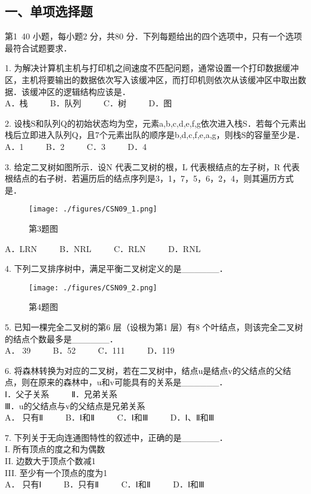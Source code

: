 
\subsection{一、单项选择题}
第1~40 小题，每小题2 分，共80 分．下列每题给出的四个选项中，只有一个选项最符合试题要求．

1. 为解决计算机主机与打印机之间速度不匹配问题，通常设置一个打印数据缓冲区，主机将要输出的数据依次写入该缓冲区，而打印机则依次从该缓冲区中取出数据．该缓冲区的逻辑结构应该是． \\
A．栈 $\qquad$ B．队列 $\qquad$ C．树 $\qquad$ D．图

2. 设栈S和队列Q的初始状态均为空，元素a,b,c,d,e,f,g依次进入栈S．若每个元素出栈后立即进入队列Q，且7个元素出队的顺序是b,d,c,f,e,a,g，则栈S的容量至少是． \\
A．1 $\qquad$ B．2 $\qquad$ C．3 $\qquad$ D．4

3. 给定二叉树如图所示．设N 代表二叉树的根，L 代表根结点的左子树，R 代表根结点的右子树．若遍历后的结点序列是3，1，7，5，6，2，4，则其遍历方式是． \\
\begin{figure}[ht]
\centering
\texttt{[image: ./figures/CSN09\_1.png]}
\caption{第3题图} \label{CSN09_fig1}
\end{figure}
A．LRN $\qquad$ B．NRL $\qquad$ C．RLN $\qquad$ D．RNL

4. 下列二叉排序树中，满足平衡二叉树定义的是______．\\
\begin{figure}[ht]
\centering
\texttt{[image: ./figures/CSN09\_2.png]}
\caption{第4题图} \label{CSN09_fig2}
\end{figure}

5. 已知一棵完全二叉树的第6 层（设根为第1 层）有8 个叶结点，则该完全二叉树的结点个数最多是______． \\
A． 39 $\qquad$ B．52 $\qquad$ C．111 $\qquad$ D．119

6. 将森林转换为对应的二叉树，若在二叉树中，结点u是结点v的父结点的父结点，则在原来的森林中，u和v可能具有的关系是______． \\
Ⅰ．父子关系 $\qquad$ Ⅱ．兄弟关系 \\
Ⅲ．u的父结点与v的父结点是兄弟关系 \\
A． 只有Ⅱ $\qquad$ B．Ⅰ和Ⅱ $\qquad$ C．Ⅰ和Ⅲ $\qquad$ D．Ⅰ、Ⅱ和Ⅲ

7. 下列关于无向连通图特性的叙述中，正确的是______． \\
I. 所有顶点的度之和为偶数 \\
II. 边数大于顶点个数减1 \\
III. 至少有一个顶点的度为1 \\
A． 只有Ⅰ $\qquad$ B．只有Ⅱ $\qquad$ C．Ⅰ和Ⅱ $\qquad$ D．Ⅰ和Ⅲ

